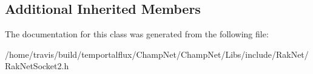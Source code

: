 \subsection*{Additional Inherited Members}


The documentation for this class was generated from the following file\-:\begin{DoxyCompactItemize}
\item 
/home/travis/build/temportalflux/\-Champ\-Net/\-Champ\-Net/\-Libs/include/\-Rak\-Net/Rak\-Net\-Socket2.\-h\end{DoxyCompactItemize}
